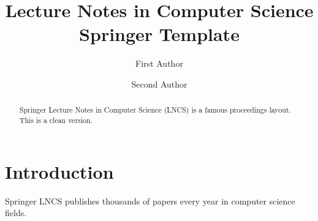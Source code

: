\documentclass{llncs}
\begin{document}
\title{Lecture Notes in Computer Science Springer Template}
\author{First Author \and Second Author}
\maketitle

\begin{abstract}
Springer Lecture Notes in Computer Science (LNCS) is a famous proceedings layout. This is a clean version.
\end{abstract}

\section{Introduction}
Springer LNCS publishes thousands of papers every year in computer science fields.
\end{document}

